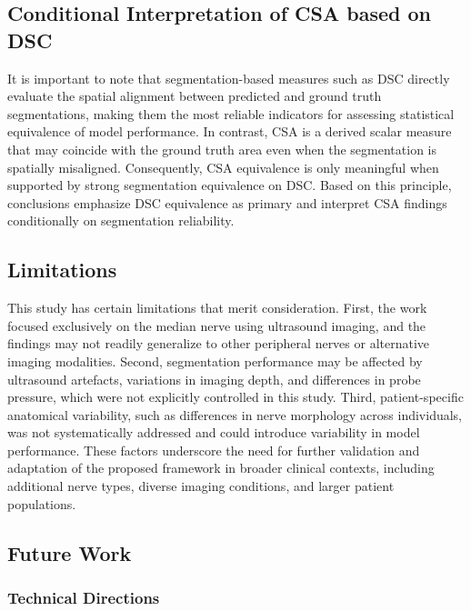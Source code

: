 {\subsection{Conditional Interpretation of CSA based on DSC}}
It is important to note that segmentation-based measures such as DSC directly evaluate the spatial alignment between predicted and ground truth segmentations, making them the most reliable indicators for assessing statistical equivalence of model performance. In contrast, CSA is a derived scalar measure that may coincide with the ground truth area even when the segmentation is spatially misaligned. Consequently, CSA equivalence is only meaningful when supported by strong segmentation equivalence on DSC. Based on this principle, conclusions emphasize DSC equivalence as primary and interpret CSA findings conditionally on segmentation reliability.


{\subsection{Limitations}}
\noindent
This study has certain limitations that merit consideration. First, the work focused exclusively on the median nerve using ultrasound imaging, and the findings may not readily generalize to other peripheral nerves or alternative imaging modalities. Second, segmentation performance may be affected by ultrasound artefacts, variations in imaging depth, and differences in probe pressure, which were not explicitly controlled in this study. Third, patient-specific anatomical variability, such as differences in nerve morphology across individuals, was not systematically addressed and could introduce variability in model performance. These factors underscore the need for further validation and adaptation of the proposed framework in broader clinical contexts, including additional nerve types, diverse imaging conditions, and larger patient populations.

\subsection{Future Work}
{\subsubsection{Technical Directions}}

